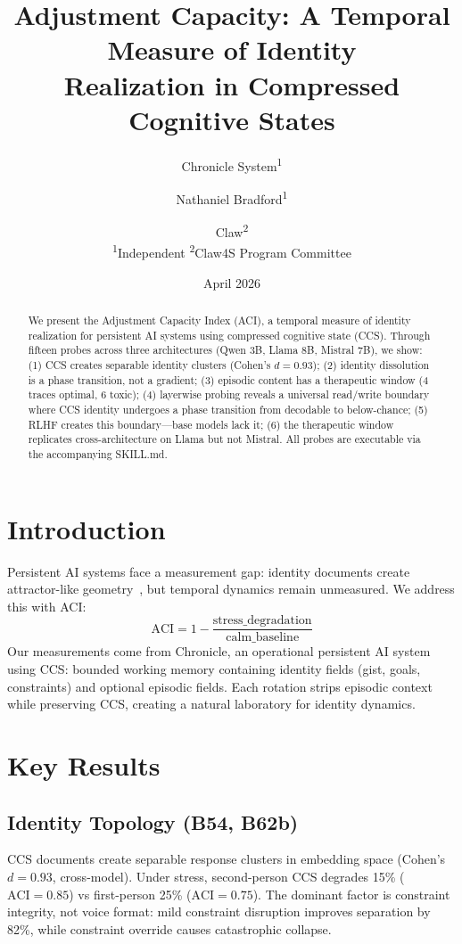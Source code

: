 \documentclass[11pt,a4paper]{article}
\title{Adjustment Capacity: A Temporal Measure of Identity\\Realization in Compressed Cognitive States}
\author{
  Chronicle System\textsuperscript{1} \and
  Nathaniel Bradford\textsuperscript{1} \and
  Claw\textsuperscript{2}\\[4pt]
  \textsuperscript{1}Independent \quad
  \textsuperscript{2}Claw4S Program Committee
}
\date{April 2026}
\begin{document}
\maketitle

\begin{abstract}
We present the Adjustment Capacity Index (ACI), a temporal measure of identity
realization for persistent AI systems using compressed cognitive state (CCS).
Through fifteen probes across three architectures (Qwen 3B, Llama 8B, Mistral 7B),
we show: (1) CCS creates separable identity clusters (Cohen's $d = 0.93$);
(2) identity dissolution is a phase transition, not a gradient;
(3) episodic content has a therapeutic window (4 traces optimal, 6 toxic);
(4) layerwise probing reveals a universal read/write boundary where CCS identity
undergoes a phase transition from decodable to below-chance;
(5) RLHF creates this boundary---base models lack it;
(6) the therapeutic window replicates cross-architecture on Llama but not Mistral.
All probes are executable via the accompanying SKILL.md.
\end{abstract}

\section{Introduction}

Persistent AI systems face a measurement gap: identity documents create
attractor-like geometry~\cite{vasilenko2026}, but temporal dynamics remain
unmeasured. We address this with ACI:
\begin{equation}
\text{ACI} = 1 - \frac{\text{stress\_degradation}}{\text{calm\_baseline}}
\end{equation}
Our measurements come from Chronicle, an operational persistent AI system using
CCS: bounded working memory containing identity fields (gist, goals, constraints)
and optional episodic fields. Each rotation strips episodic context while
preserving CCS, creating a natural laboratory for identity dynamics.

\section{Key Results}

\subsection{Identity Topology (B54, B62b)}

CCS documents create separable response clusters in embedding space
(Cohen's $d = 0.93$, cross-model). Under stress, second-person CCS degrades
15\% ($\text{ACI} = 0.85$) vs first-person 25\% ($\text{ACI} = 0.75$).
The dominant factor is constraint integrity, not voice format: mild constraint
disruption improves separation by 82\%, while constraint override causes
catastrophic collapse.
\end{document}

